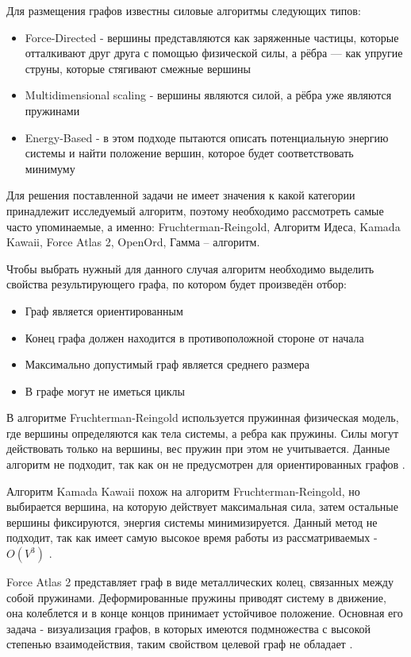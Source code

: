 Для размещения графов известны силовые алгоритмы следующих типов\cite{alg-graph}:
\begin{itemize}
\item Force-Directed - вершины представляются как заряженные частицы, которые отталкивают друг друга с помощью физической силы, а рёбра — как упругие струны, которые стягивают смежные вершины
\item Multidimensional scaling - вершины являются силой, а рёбра уже являются пружинами
\item Energy-Based - в этом подходе пытаются описать потенциальную энергию системы и найти положение вершин, которое будет соответствовать минимуму
\end{itemize}

Для решения поставленной задачи не имеет значения к какой категории принадлежит исследуемый алгоритм, поэтому необходимо рассмотреть самые часто упоминаемые, а именно: Fruchterman-Reingold, Алгоритм Идеса, Kamada Kawaii, Force Atlas 2, OpenOrd, Гамма – алгоритм.

Чтобы выбрать нужный для данного случая алгоритм необходимо выделить свойства результирующего графа, по котором будет произведён отбор:
\begin{itemize}
\item Граф является ориентированным
\item Конец графа должен находится в противоположной стороне от начала
\item Максимально допустимый граф является среднего размера
\item В графе могут не иметься циклы
\end{itemize}

В алгоритме Fruchterman-Reingold используется пружинная физическая модель, где вершины определяются как тела системы, а ребра как пружины. Силы могут действовать только на вершины, вес пружин при этом не учитывается. Данные алгоритм не подходит, так как он не предусмотрен для ориентированных графов \cite{alg-fruchterman}.

Алгоритм Kamada Kawaii похож на алгоритм Fruchterman-Reingold, но выбирается вершина, на которую действует максимальная сила, затем остальные вершины фиксируются, энергия системы минимизируется. Данный метод не подходит, так как имеет самую высокое время работы из рассматриваемых - $O(V^3)$ \cite{alg-kamada-kawai}.

Force Atlas 2 представляет граф в виде металлических колец, связанных между собой пружинами. Деформированные пружины приводят систему в движение, она колеблется и в конце концов принимает устойчивое положение. Основная его задача - визуализация графов, в которых имеются подмножества с высокой степенью взаимодействия, таким свойством целевой граф не обладает \cite{alg-force-atlas-2}.

